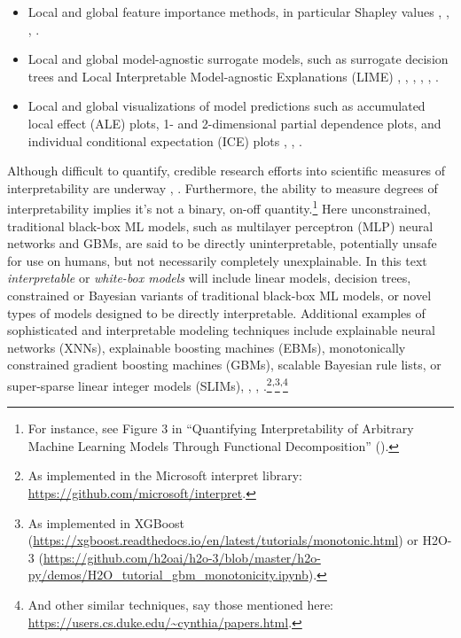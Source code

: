 \documentclass[fleqn]{article}
\begin{document}
\begin{itemize}
\item Local and global feature importance methods, in particular Shapley values \cite{keinan2004fair}, \cite{shapley}, \cite{shapley1988shapley}, \cite{kononenko2010efficient}.
\item Local and global model-agnostic surrogate models, such as surrogate decision trees and Local Interpretable Model-agnostic Explanations (LIME) \cite{dt_surrogate2}, \cite{viper}, \cite{dt_surrogate1}, \cite{lime-sup}, \cite{lime}, \cite{wf_xnn}. 
\item Local and global visualizations of model predictions such as accumulated local effect (ALE) plots, 1- and 2-dimensional partial dependence plots, and individual conditional expectation (ICE) plots \cite{ale_plot}, \cite{esl}, \cite{ice_plots}.
\end{itemize}  

Although difficult to quantify, credible research efforts into scientific measures of interpretability are underway \cite{friedler2019assessing}, \cite{molnar2019quantifying}. Furthermore, the ability to measure degrees of interpretability implies it's not a binary, on-off quantity.\footnote{For instance, see Figure 3 in ``Quantifying Interpretability of Arbitrary Machine Learning Models Through Functional Decomposition'' (\citet{molnar2019quantifying}).} Here unconstrained, traditional black-box ML models, such as multilayer perceptron (MLP) neural networks and GBMs, are said to be directly uninterpretable, potentially unsafe for use on humans, but not necessarily completely unexplainable. In this text \textit{interpretable} or \textit{white-box models} will include linear models, decision trees, constrained or Bayesian variants of traditional black-box ML models, or novel types of models designed to be directly interpretable. Additional examples of sophisticated and interpretable modeling techniques include explainable neural networks (XNNs), explainable boosting machines (EBMs), monotonically constrained gradient boosting machines (GBMs), scalable Bayesian rule lists, or super-sparse linear integer models (SLIMs), \cite{slim}, \cite{wf_xnn}, \cite{sbrl}.\footnote{As implemented in the Microsoft interpret library: \url{https://github.com/microsoft/interpret}.}\textsuperscript{,}\footnote{As implemented in XGBoost (\url{https://xgboost.readthedocs.io/en/latest/tutorials/monotonic.html}) or H2O-3 (\url{https://github.com/h2oai/h2o-3/blob/master/h2o-py/demos/H2O_tutorial_gbm_monotonicity.ipynb}).}\textsuperscript{,}\footnote{And other similar techniques, say those mentioned here: \url{https://users.cs.duke.edu/~cynthia/papers.html}.}
\end{document}
